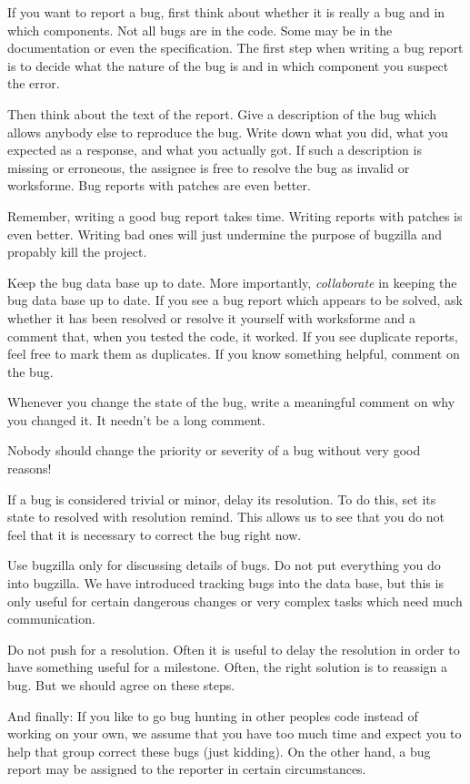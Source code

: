 \documentclass[11pt,nologo,handout]{handout}
\begin{document}
If you want to report a bug, first think about whether it is really a
bug and in which components.  Not all bugs are in the code.  Some may
be in the documentation or even the specification.  The first step when
writing a bug report is to decide what the nature of the bug is and in
which component you suspect the error.

Then think about the text of the report.  Give a description of the bug
which allows anybody else to reproduce the bug.  Write down what you did,
what you expected as a response, and what you actually got.  If such a
description is missing or erroneous, the assignee is free to resolve
the bug as invalid or worksforme.  Bug reports with patches are even
better.

Remember, writing a good bug report takes time.  Writing reports with
patches is even better.  Writing bad ones will just undermine the
purpose of bugzilla and propably kill the project.

Keep the bug data base up to date.  More importantly, \emph{collaborate}
in keeping the bug data base up to date.  If you see a bug report which
appears to be solved, ask whether it has been resolved or resolve it
yourself with worksforme and a comment that, when you tested the code,
it worked.  If you see duplicate reports, feel free to mark them as
duplicates.  If you know something helpful, comment on the bug.

Whenever you change the state of the bug, write a meaningful comment
on why you changed it.  It needn't be a long comment.

Nobody should change the priority or severity of a bug without very
good reasons!

If a bug is considered trivial or minor, delay its resolution.  To do
this, set its state to resolved with resolution remind.  This allows
us to see that you do not feel that it is necessary to correct the bug
right now.

Use bugzilla only for discussing details of bugs.  Do not put everything
you do into bugzilla.  We have introduced tracking bugs into the
data base, but this is only useful for certain dangerous changes or very
complex tasks which need much communication.

Do not push for a resolution.  Often it is useful to delay the resolution
in order to have something useful for a milestone.  Often, the right
solution is to reassign a bug.  But we should agree on these steps.

And finally: If you like to go bug hunting in other peoples code instead
of working on your own, we assume that you have too much time and expect
you to help that group correct these bugs (just kidding).  On the other
hand, a bug report may be assigned to the reporter in certain
circumstances.
\end{document}
